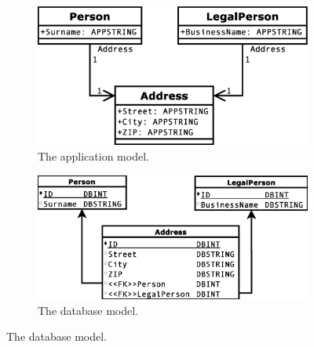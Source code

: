 \documentclass[11pt]{article}
\begin{document}
\begin{figure}
\begin{subfigure}[b]{0.45\textwidth}
	\centering
	\includegraphics[width=\textwidth]{./images/case_app_9}
	\caption{The application model.}
\end{subfigure}
\quad
\begin{subfigure}[b]{0.45\textwidth}
	\centering
	\includegraphics[width=\textwidth]{./images/case_db_8}
	\caption{The database model.}
\end{subfigure}


\end{figure}
\end{document}
